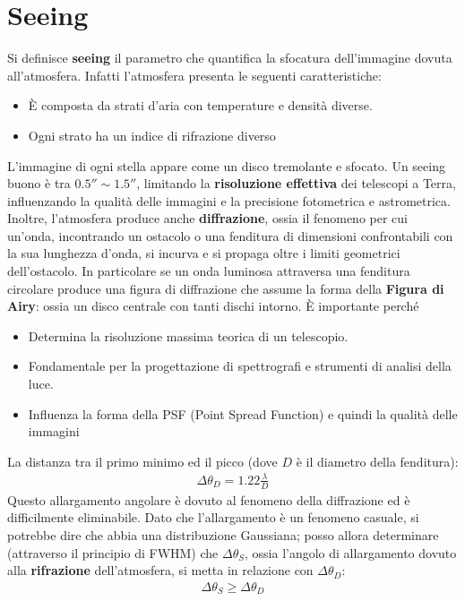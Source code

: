 \documentclass[a4paper, oneside]{book}
\begin{document}
\section{Seeing}
Si definisce \textbf{seeing} il parametro che quantifica la sfocatura dell'immagine
dovuta all'atmosfera. Infatti l'atmosfera presenta le seguenti caratteristiche:
\begin{itemize}
    \item È composta da strati d'aria con temperature e densità diverse. 
    \item Ogni strato ha un indice di rifrazione diverso
\end{itemize}
L'immagine di ogni stella appare come un disco tremolante e sfocato. Un seeing buono è tra 
$0.5'' \sim 1.5''$, limitando la \textbf{risoluzione effettiva} dei telescopi a Terra, influenzando 
la qualità delle immagini e la precisione fotometrica e astrometrica.
Inoltre, l'atmosfera produce anche \textbf{diffrazione}, ossia il fenomeno per cui un’onda, incontrando un ostacolo o una fenditura di 
dimensioni confrontabili con la sua lunghezza d’onda, si incurva e si propaga oltre i 
limiti geometrici dell’ostacolo.
In particolare se un onda luminosa attraversa una fenditura circolare produce una figura di diffrazione 
che assume la forma della \textbf{Figura di Airy}: ossia un disco centrale con tanti dischi intorno.
È importante perché
\begin{itemize}
    \item Determina la risoluzione massima teorica di un telescopio.
    \item Fondamentale per la progettazione di spettrografi e strumenti di analisi della  luce.
    \item Influenza la forma della PSF (Point Spread Function) e quindi la qualità delle immagini
\end{itemize}
La distanza tra il primo minimo ed il picco (dove $D$ è il diametro della fenditura):
\begin{gather*}
    \Delta \theta_D = 1.22 \frac{\lambda}{D}
\end{gather*}
Questo allargamento angolare è dovuto al fenomeno della diffrazione ed è difficilmente 
eliminabile. Dato che l'allargamento è un
fenomeno casuale, si potrebbe dire che abbia una distribuzione Gaussiana; posso 
allora determinare (attraverso il principio di FWHM) che
 $\Delta \theta_S$, ossia l'angolo di allargamento dovuto alla
\textbf{rifrazione} dell'atmosfera, si metta in relazione con $\Delta \theta_D$:
\begin{gather*}
    \Delta \theta_S \geq \Delta \theta_D
\end{gather*}
\end{document}
